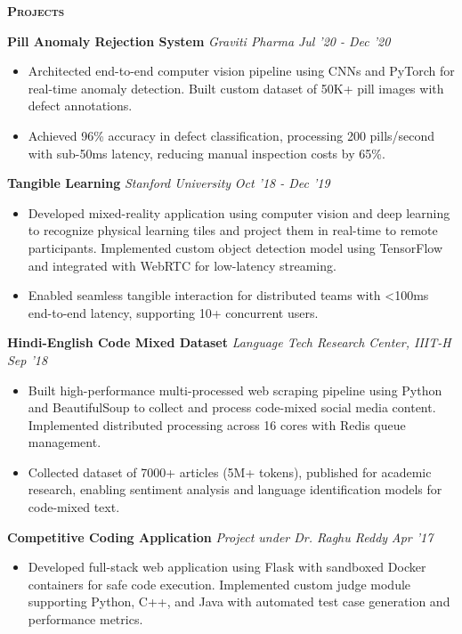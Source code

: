 \documentclass[10pt]{article}
\newcommand{\headerwidth}{7.45in}
\newenvironment{changemargin}[2]{%
  \begin{list}{}{%
    \setlength{\topsep}{0pt}%
    \setlength{\leftmargin}{#1}%
    \setlength{\rightmargin}{#2}%
    \setlength{\listparindent}{\parindent}%
    \setlength{\itemindent}{\parindent}%
    \setlength{\parsep}{\parskip}%
  }%
  \item[]}{\end{list}
}
\newcommand{\header}[1]{
	\begin{changemargin}{-0.75in}{-0.75in}
    \begin{tcolorbox}[colframe=mycolor,boxrule=0.0pt,arc=0pt,
      left=6pt,right=6pt,top=6pt,bottom=6pt,boxsep=0pt,width=\headerwidth]
		\scshape{\textbf{#1}}
\end{tcolorbox}
	\end{changemargin}
}
\newenvironment{body} {
	\vspace*{-16pt}
	\begin{changemargin}{-0.6in}{-0.65in}
  }
	{\end{changemargin}
}
\begin{document}
\smallskip
\header{Projects}
\begin{body}
	\vspace{14pt}
	\textbf{Pill Anomaly Rejection System} \emph{Graviti Pharma} \hfill \emph{Jul '20 - Dec '20}
    \begin{itemize}
        \item Architected end-to-end computer vision pipeline using CNNs and PyTorch for real-time anomaly detection. Built custom dataset of 50K+ pill images with defect annotations.
        \item Achieved 96\% accuracy in defect classification, processing 200 pills/second with sub-50ms latency, reducing manual inspection costs by 65\%.
    \end{itemize}
	\textbf{Tangible Learning} \emph{Stanford University} \hfill \emph{Oct '18 - Dec '19}
    \begin{itemize}
        \item Developed mixed-reality application using computer vision and deep learning to recognize physical learning tiles and project them in real-time to remote participants. Implemented custom object detection model using TensorFlow and integrated with WebRTC for low-latency streaming.
        \item Enabled seamless tangible interaction for distributed teams with \textless{}100ms end-to-end latency, supporting 10+ concurrent users.
    \end{itemize}
	\textbf{Hindi-English Code Mixed Dataset} \emph{Language Tech Research Center, IIIT-H} \hfill \emph{Sep '18}
    \begin{itemize}
        \item Built high-performance multi-processed web scraping pipeline using Python and BeautifulSoup to collect and process code-mixed social media content. Implemented distributed processing across 16 cores with Redis queue management.
        \item Collected dataset of 7000+ articles (5M+ tokens), published for academic research, enabling sentiment analysis and language identification models for code-mixed text.
    \end{itemize}
	\textbf{Competitive Coding Application} \emph{Project under Dr. Raghu Reddy} \hfill \emph{Apr '17}
    \begin{itemize}
        \item Developed full-stack web application using Flask with sandboxed Docker containers for safe code execution. Implemented custom judge module supporting Python, C++, and Java with automated test case generation and performance metrics.

\end{itemize}
\end{body}
\end{document}
